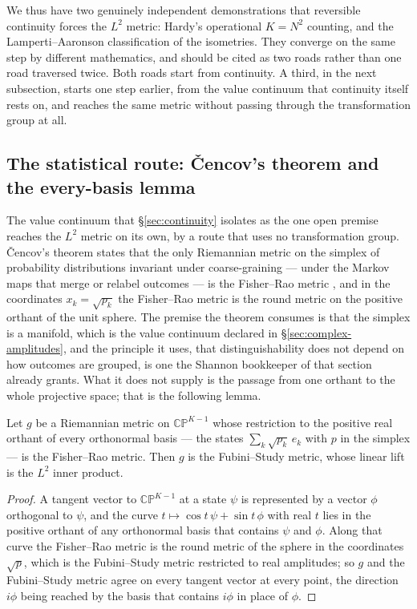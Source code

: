 We thus have two genuinely independent demonstrations that reversible continuity forces the
$L^{2}$ metric: Hardy's operational $K=N^{2}$ counting, and the Lamperti--Aaronson
classification of the isometries. They converge on the same step by different mathematics, and
should be cited as two roads rather than one road traversed twice. Both roads start from
continuity. A third, in the next subsection, starts one step earlier, from the value continuum
that continuity itself rests on, and reaches the same metric without passing through the
transformation group at all.

\subsection{The statistical route: \v{C}encov's theorem and the every-basis lemma}
\label{sec:cencov-route}

The value continuum that \S\ref{sec:continuity} isolates as the one open premise reaches the
$L^{2}$ metric on its own, by a route that uses no transformation group. \v{C}encov's theorem
states that the only Riemannian metric on the simplex of probability distributions invariant
under coarse-graining --- under the Markov maps that merge or relabel outcomes --- is the
Fisher--Rao metric \autocite{bengtsson2006geometry}, and in the coordinates $x_{k} =
\sqrt{p_{k}}$ the Fisher--Rao metric is the round metric on the positive orthant of the unit
sphere. The premise the theorem consumes is that the simplex is a manifold, which is the value
continuum declared in \S\ref{sec:complex-amplitudes}, and the principle it uses, that
distinguishability does not depend on how outcomes are grouped, is one the Shannon bookkeeper of
that section already grants. What it does not supply is the passage from one orthant to the
whole projective space; that is the following lemma.

\begin{lemma}\label{lem:every-basis}
Let $g$ be a Riemannian metric on $\mathbb{CP}^{K-1}$ whose restriction to the positive real
orthant of every orthonormal basis --- the states $\sum_{k}\sqrt{p_{k}}\,e_{k}$ with $p$ in the
simplex --- is the Fisher--Rao metric. Then $g$ is the Fubini--Study metric, whose linear lift
is the $L^{2}$ inner product.
\end{lemma}

\begin{proof}
A tangent vector to $\mathbb{CP}^{K-1}$ at a state $\psi$ is represented by a vector $\phi$
orthogonal to $\psi$, and the curve $t \mapsto \cos t\,\psi + \sin t\,\phi$ with real $t$ lies
in the positive orthant of any orthonormal basis that contains $\psi$ and $\phi$. Along that
curve the Fisher--Rao metric is the round metric of the sphere in the coordinates $\sqrt{p}$,
which is the Fubini--Study metric restricted to real amplitudes; so $g$ and the Fubini--Study
metric agree on every tangent vector at every point, the direction $i\phi$ being reached by the
basis that contains $i\phi$ in place of $\phi$.
\end{proof}

